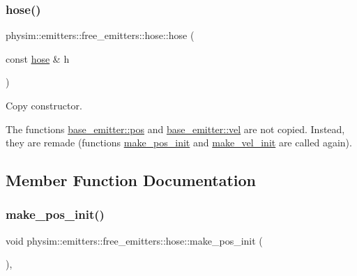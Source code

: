 \subsubsection{\texorpdfstring{hose()}{hose()}}
{\footnotesize\ttfamily physim\+::emitters\+::free\+\_\+emitters\+::hose\+::hose (\begin{DoxyParamCaption}\item[{const \hyperlink{classphysim_1_1emitters_1_1free__emitters_1_1hose}{hose} \&}]{h }\end{DoxyParamCaption})}



Copy constructor. 

The functions \hyperlink{classphysim_1_1emitters_1_1base__emitter_ac67584a2ca34232c1f4f04c41599df0e}{base\+\_\+emitter\+::pos} and \hyperlink{classphysim_1_1emitters_1_1base__emitter_a9ea19d96450cff65882371b61a2294c8}{base\+\_\+emitter\+::vel} are not copied. Instead, they are remade (functions \hyperlink{classphysim_1_1emitters_1_1free__emitters_1_1hose_a6c78d604106eb5b8d20021f56f9512ba}{make\+\_\+pos\+\_\+init} and \hyperlink{classphysim_1_1emitters_1_1free__emitters_1_1hose_a7976365f9101e4095d00dc8eafc82ebb}{make\+\_\+vel\+\_\+init} are called again). 

\subsection{Member Function Documentation}
\mbox{\label{classphysim_1_1emitters_1_1free__emitters_1_1hose_a6c78d604106eb5b8d20021f56f9512ba}} 
\subsubsection{\texorpdfstring{make\+\_\+pos\+\_\+init()}{make\_pos\_init()}}
{\footnotesize\ttfamily void physim\+::emitters\+::free\+\_\+emitters\+::hose\+::make\+\_\+pos\+\_\+init (\begin{DoxyParamCaption}{ }\end{DoxyParamCaption})\hspace{0.3cm}{\ttfamily [protected]}, {\ttfamily [virtual]}}



